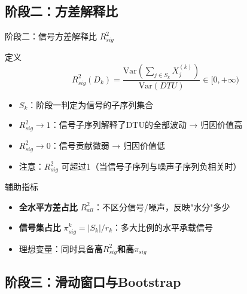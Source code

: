 \documentclass{beamer}
\begin{document}
\subsection{阶段二：方差解释比}

\begin{frame}{阶段二：信号方差解释比 $R^2_{sig}$}
    \begin{block}{定义}
        \begin{equation*}
            R^2_{sig}(D_k) = \frac{\text{Var}\left(\sum_{j \in S_k} X^{(k)}_j\right)}{\text{Var}(DTU)} \in [0, +\infty)
        \end{equation*}
    \end{block}
    
    \begin{itemize}
        \item $S_k$：阶段一判定为信号的子序列集合
        \item $R^2_{sig} \to 1$：信号子序列解释了DTU的全部波动 → 归因价值高
        \item $R^2_{sig} \to 0$：信号贡献微弱 → 归因价值低
        \item 注意：$R^2_{sig}$ 可超过1（当信号子序列与噪声子序列负相关时）
    \end{itemize}
    
    \begin{block}{辅助指标}
        \begin{itemize}
            \item \textbf{全水平方差占比} $R^2_{all}$：不区分信号/噪声，反映"水分"多少
            \item \textbf{信号集占比} $\pi_{sig}^k = |S_k|/r_k$：多大比例的水平承载信号
            \item 理想变量：同时具备\textbf{高$R^2_{sig}$和高$\pi_{sig}$}
        \end{itemize}
    \end{block}
\end{frame}

\subsection{阶段三：滑动窗口与Bootstrap}
\end{document}
